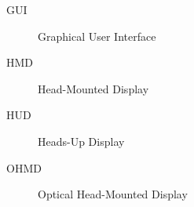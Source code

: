 \begin{description}
	\item [GUI] Graphical User Interface
	\item [HMD] Head-Mounted Display
	\item [HUD] Heads-Up Display
	\item [OHMD] Optical Head-Mounted Display
\end{description}
	